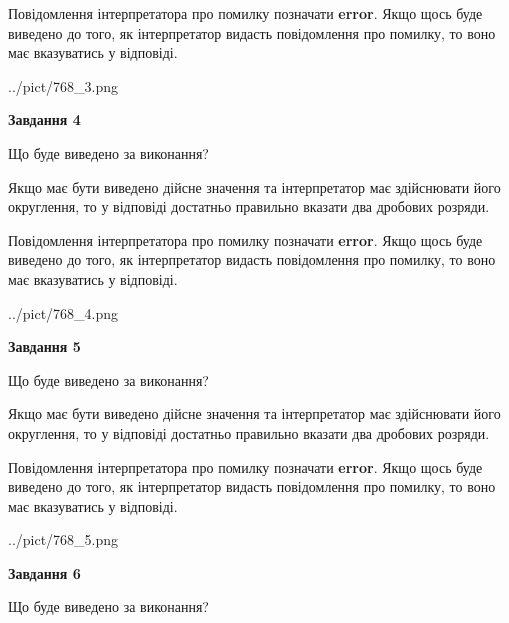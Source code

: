 \documentclass[12pt, ukrainian]{article}
\begin{document}
{\begin {Large}
Повідомлення інтерпретатора про помилку позначати \textbf{error}.
Якщо щось буде виведено до того, як інтерпретатор видасть повідомлення про помилку, 
то воно має вказуватись у відповіді. \par

\begin{center}
	{../pict/768_3.png}
\end{center}
\newpage

{\begin {center}\textbf{Завдання 4}\end {center}}\par
Що буде виведено за виконання? \par

Якщо має бути виведено дійсне значення та інтерпретатор має здійснювати його округлення, 
то у відповіді достатньо правильно вказати два дробових розряди.

Повідомлення інтерпретатора про помилку позначати \textbf{error}.
Якщо щось буде виведено до того, як інтерпретатор видасть повідомлення про помилку, 
то воно має вказуватись у відповіді. \par

\begin{center}
	{../pict/768_4.png}
\end{center}
\newpage

{\begin {center}\textbf{Завдання 5}\end {center}}\par
Що буде виведено за виконання? \par

Якщо має бути виведено дійсне значення та інтерпретатор має здійснювати його округлення, 
то у відповіді достатньо правильно вказати два дробових розряди.

Повідомлення інтерпретатора про помилку позначати \textbf{error}.
Якщо щось буде виведено до того, як інтерпретатор видасть повідомлення про помилку, 
то воно має вказуватись у відповіді. \par

\begin{center}
	{../pict/768_5.png}
\end{center}
\newpage

{\begin {center}\textbf{Завдання 6}\end {center}}\par
Що буде виведено за виконання? \par


\end{Large}}
\end{document}
